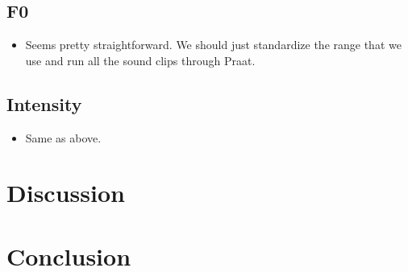 \documentclass[12pt]{article}
\begin{document}
\subsection{F0}
\begin{itemize}
\item Seems pretty straightforward. We should just standardize the range that we use and run all the sound clips through Praat. 
\end{itemize}

\subsection{Intensity}
\begin{itemize}
\item Same as above.
\end{itemize}

\section{Discussion}

\section{Conclusion}

\end{document}
